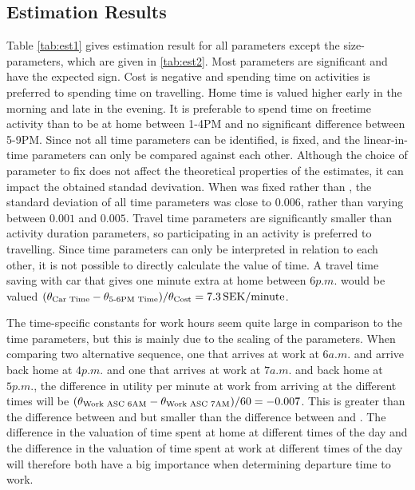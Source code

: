 \subsection{Estimation Results}
Table \ref{tab:est1} gives estimation result for all parameters except the size-parameters, which are given in \ref{tab:est2}. Most parameters are significant and have the expected sign. Cost is negative and spending time on activities is preferred to spending time on travelling. Home time is valued higher early in the morning and late in the evening. It is preferable to spend time on freetime activity than to be at home between 1-4PM and no significant difference between 5-9PM. Since not all time parameters can be identified,  is fixed, and the linear-in-time parameters can only be compared against each other. Although the choice of parameter to fix does not affect the theoretical properties of the estimates, it can impact the obtained standad devivation. When  was fixed rather than , the standard deviation of all time parameters was close to $0.006$, rather than varying between $0.001$ and $0.005$. Travel time parameters are significantly smaller than activity duration parameters, so participating in an activity is preferred to travelling. Since time parameters can only be interpreted in relation to each other, it is not possible to directly calculate the value of time. A travel time saving with car that gives one minute extra at home between $6\unit{p.m.}$ would be valued $({\theta_{\text{Car Time}}} - {\theta_{\text{5-6PM Time}}})/{\theta_{\text{Cost}}} = 7.3\, \mathrm{SEK/minute}$.

The time-specific constants for work hours seem quite large in comparison to the time parameters, but this is mainly due to the scaling of the parameters. When comparing two alternative sequence, one that arrives at work at $6\unit{a.m.}$ and arrive back home at $4\unit{p.m.}$ and one that arrives at work at $7\unit{a.m.}$ and back home at $5\unit{p.m.}$, the difference in utility per minute at work from arriving at the different times will be $({\theta_{\text{Work ASC 6AM}}}-{\theta_{\text{Work ASC 7AM}}})/60 = -0.007$. This is greater than the difference between  and  but smaller than the difference between  and . The difference in the valuation of time spent at home at different times of the day and the difference in the valuation of time spent at work at different times of the day will therefore both have a big importance when determining departure time to work.

